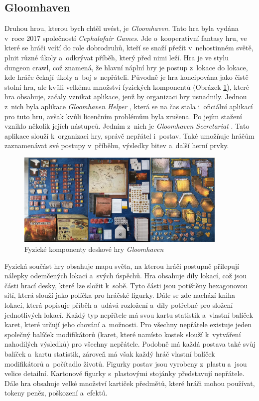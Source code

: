 \subsection{Gloomhaven}
Druhou hrou, kterou bych chtěl uvést, je \textit{Gloomhaven}. Tato hra byla vydána v~roce 2017 společností \textit{Cephalofair Games}. Jde o~kooperativní fantasy hru, ve které se hráči vcítí do role dobrodruhů, kteří se snaží přežít v~nehostinném světě, plnit různé úkoly a~odkrývat příběh, který před nimi leží. Hra je ve stylu dungeon crawl, což znamená, že hlavní náplní hry je postup z~lokace do lokace, kde hráče čekají úkoly a~boj s~nepřáteli. Původně je hra koncipována jako čistě stolní hra, ale kvůli velkému množství fyzických komponentů (Obrázek \ref{fig:gloomhaven_contents}), které hra obsahuje, začaly vznikat aplikace, jenž by organizaci hry usnadnily. Jednou z~nich byla aplikace \textit{Gloomhaven Helper} \cite{gloomhaven_helper}, která se na čas stala i~oficiální aplikací pro tuto hru, avšak kvůli licenčním problémům byla zrušena. Po jejím stažení vzniklo několik jejích nástupců. Jedním z~nich je \textit{Gloomhaven Secretariat} \cite{gloomhaven_secretariat}. Tato aplikace slouží k~organizaci hry, správě nepřátel i~postav. Také umožňuje hráčům zaznamenávat své postupy v~příběhu, výsledky bitev a~další herní prvky.

\begin{figure}[H]
    \centering
    \includegraphics[width=0.9\textwidth]{resources/figures/gloomhaven.png}
    \caption{Fyzické komponenty deskové hry \textit{Gloomhaven} \cite{gloomhaven}}
    \label{fig:gloomhaven_contents}
\end{figure}

Fyzická součást hry obsahuje mapu světa, na kterou hráči postupně přilepují nálepky odemčených lokací a~svých úspěchů. Hra obsahuje díly lokací, což jsou části hrací desky, které lze složit k~sobě. Tyto části jsou potištěny hexagonovou sítí, která slouží jako políčka pro hráčské figurky. Dále se zde nachází kniha lokací, která popisuje příběh a~udává rozložení a~díly potřebné pro složení jednotlivých lokací. Každý typ nepřítele má svou kartu statistik a~vlastní balíček karet, které určují jeho chování a~možnosti. Pro všechny nepřátele existuje jeden společný balíček modifikátorů (karet, které namísto kostek slouží k~vytváření nahodilých výsledků) pro všechny nepřátele. Podobně má každá postava také svůj balíček a~kartu statistik, zároveň má však každý hráč vlastní balíček modifikátorů a~počítadlo životů. Figurky postav jsou vyrobeny z~plastu a~jsou velice detailní. Kartonové figurky s~plastovými stojánky představují nepřátele. Dále hra obsahuje velké množství kartiček předmětů, které hráči mohou používat, tokeny peněz, poškození a~efektů.